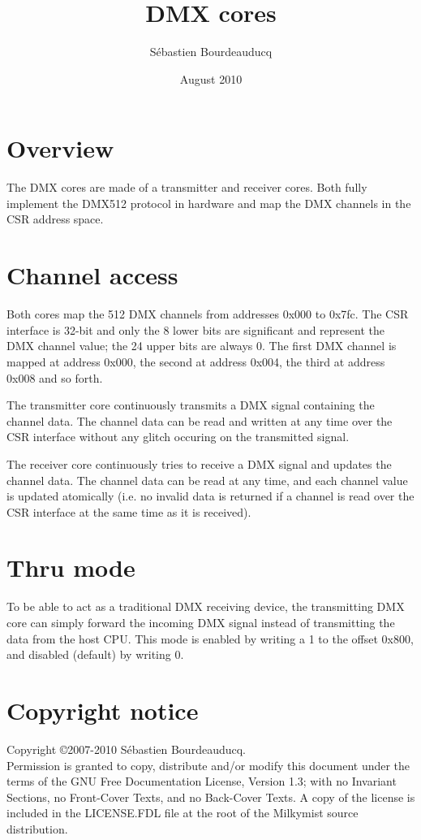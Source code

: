 \documentclass[a4paper,11pt]{article}
\title{DMX cores}
\author{S\'ebastien Bourdeauducq}
\date{August 2010}
\begin{document}
\setlength{\parindent}{0pt}
\setlength{\parskip}{5pt}
\maketitle{}
\section{Overview}
The DMX cores are made of a transmitter and receiver cores. Both fully implement the DMX512 protocol in hardware and map the DMX channels in the CSR address space.

\section{Channel access}
Both cores map the 512 DMX channels from addresses 0x000 to 0x7fc. The CSR interface is 32-bit and only the 8 lower bits are significant and represent the DMX channel value; the 24 upper bits are always 0. The first DMX channel is mapped at address 0x000, the second at address 0x004, the third at address 0x008 and so forth.

The transmitter core continuously transmits a DMX signal containing the channel data. The channel data can be read and written at any time over the CSR interface without any glitch occuring on the transmitted signal.

The receiver core continuously tries to receive a DMX signal and updates the channel data. The channel data can be read at any time, and each channel value is updated atomically (i.e. no invalid data is returned if a channel is read over the CSR interface at the same time as it is received).

\section{Thru mode}
To be able to act as a traditional DMX receiving device, the transmitting DMX core can simply forward the incoming DMX signal instead of transmitting the data from the host CPU. This mode is enabled by writing a 1 to the offset 0x800, and disabled (default) by writing 0.

\section*{Copyright notice}
Copyright \copyright 2007-2010 S\'ebastien Bourdeauducq. \\
Permission is granted to copy, distribute and/or modify this document under the terms of the GNU Free Documentation License, Version 1.3; with no Invariant Sections, no Front-Cover Texts, and no Back-Cover Texts. A copy of the license is included in the LICENSE.FDL file at the root of the Milkymist source distribution.
\end{document}
